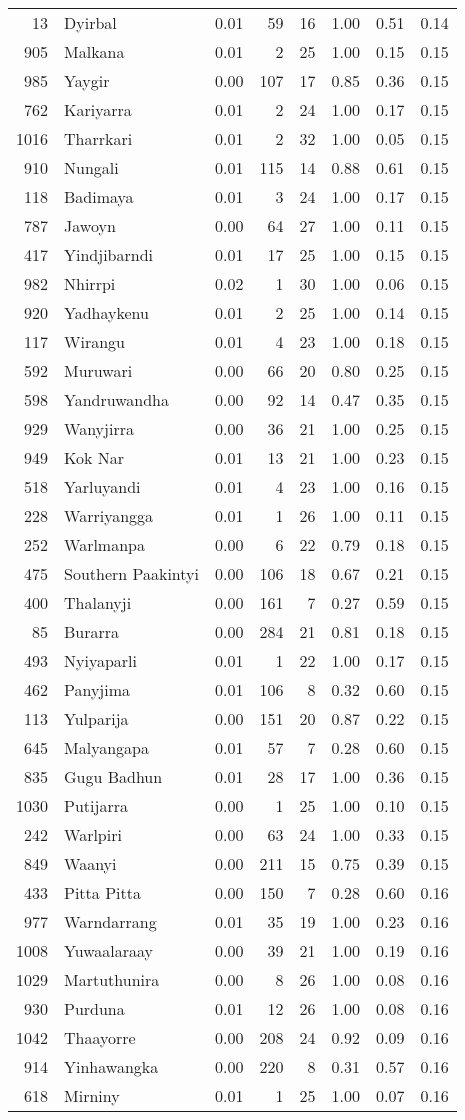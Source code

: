 \begin{longtable}[]{@{}rlrrrrrr@{}}
13 & Dyirbal & 0.01 & 59 & 16 & 1.00 & 0.51 & 0.14\tabularnewline
905 & Malkana & 0.01 & 2 & 25 & 1.00 & 0.15 & 0.15\tabularnewline
985 & Yaygir & 0.00 & 107 & 17 & 0.85 & 0.36 & 0.15\tabularnewline
762 & Kariyarra & 0.01 & 2 & 24 & 1.00 & 0.17 & 0.15\tabularnewline
1016 & Tharrkari & 0.01 & 2 & 32 & 1.00 & 0.05 & 0.15\tabularnewline
910 & Nungali & 0.01 & 115 & 14 & 0.88 & 0.61 & 0.15\tabularnewline
118 & Badimaya & 0.01 & 3 & 24 & 1.00 & 0.17 & 0.15\tabularnewline
787 & Jawoyn & 0.00 & 64 & 27 & 1.00 & 0.11 & 0.15\tabularnewline
417 & Yindjibarndi & 0.01 & 17 & 25 & 1.00 & 0.15 & 0.15\tabularnewline
982 & Nhirrpi & 0.02 & 1 & 30 & 1.00 & 0.06 & 0.15\tabularnewline
920 & Yadhaykenu & 0.01 & 2 & 25 & 1.00 & 0.14 & 0.15\tabularnewline
117 & Wirangu & 0.01 & 4 & 23 & 1.00 & 0.18 & 0.15\tabularnewline
592 & Muruwari & 0.00 & 66 & 20 & 0.80 & 0.25 & 0.15\tabularnewline
598 & Yandruwandha & 0.00 & 92 & 14 & 0.47 & 0.35 & 0.15\tabularnewline
929 & Wanyjirra & 0.00 & 36 & 21 & 1.00 & 0.25 & 0.15\tabularnewline
949 & Kok Nar & 0.01 & 13 & 21 & 1.00 & 0.23 & 0.15\tabularnewline
518 & Yarluyandi & 0.01 & 4 & 23 & 1.00 & 0.16 & 0.15\tabularnewline
228 & Warriyangga & 0.01 & 1 & 26 & 1.00 & 0.11 & 0.15\tabularnewline
252 & Warlmanpa & 0.00 & 6 & 22 & 0.79 & 0.18 & 0.15\tabularnewline
475 & Southern Paakintyi & 0.00 & 106 & 18 & 0.67 & 0.21 &
0.15\tabularnewline
400 & Thalanyji & 0.00 & 161 & 7 & 0.27 & 0.59 & 0.15\tabularnewline
85 & Burarra & 0.00 & 284 & 21 & 0.81 & 0.18 & 0.15\tabularnewline
493 & Nyiyaparli & 0.01 & 1 & 22 & 1.00 & 0.17 & 0.15\tabularnewline
462 & Panyjima & 0.01 & 106 & 8 & 0.32 & 0.60 & 0.15\tabularnewline
113 & Yulparija & 0.00 & 151 & 20 & 0.87 & 0.22 & 0.15\tabularnewline
645 & Malyangapa & 0.01 & 57 & 7 & 0.28 & 0.60 & 0.15\tabularnewline
835 & Gugu Badhun & 0.01 & 28 & 17 & 1.00 & 0.36 & 0.15\tabularnewline
1030 & Putijarra & 0.00 & 1 & 25 & 1.00 & 0.10 & 0.15\tabularnewline
242 & Warlpiri & 0.00 & 63 & 24 & 1.00 & 0.33 & 0.15\tabularnewline
849 & Waanyi & 0.00 & 211 & 15 & 0.75 & 0.39 & 0.15\tabularnewline
433 & Pitta Pitta & 0.00 & 150 & 7 & 0.28 & 0.60 & 0.16\tabularnewline
977 & Warndarrang & 0.01 & 35 & 19 & 1.00 & 0.23 & 0.16\tabularnewline
1008 & Yuwaalaraay & 0.00 & 39 & 21 & 1.00 & 0.19 & 0.16\tabularnewline
1029 & Martuthunira & 0.00 & 8 & 26 & 1.00 & 0.08 & 0.16\tabularnewline
930 & Purduna & 0.01 & 12 & 26 & 1.00 & 0.08 & 0.16\tabularnewline
1042 & Thaayorre & 0.00 & 208 & 24 & 0.92 & 0.09 & 0.16\tabularnewline
914 & Yinhawangka & 0.00 & 220 & 8 & 0.31 & 0.57 & 0.16\tabularnewline
618 & Mirniny & 0.01 & 1 & 25 & 1.00 & 0.07 & 0.16\tabularnewline

\end{longtable}
